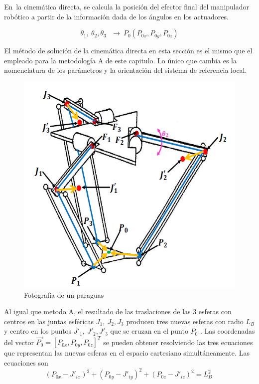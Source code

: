         En\ la cinemática directa, se calcula la posición del efector final del manipulador robótico a partir de la información dada de los ángulos en los actuadores.


        \begin{equation}
            \theta _{1},~ \theta _{2}, \theta _{3}~~~ \rightarrow ~  {P_{0}} \left( P_{0x},P_{0y},P_{0z} \right)
        \label{eq:cap4_MB_1}
        \end{equation}

        El método de solución de la cinemática directa en esta sección es el mismo que el empleado para la metodología A de este capitulo. Lo único que cambia es la nomenclatura de los parámetros y la orientación del sistema de referencia local.
        
            \begin{figure}[htb]
                 \centering
                 \includegraphics[width=0.7\linewidth]{Main/Chapter4/Images4/Metodo_B_Modelacion_Cinematica_Posicion_3.png}
                  \caption{Fotografía de un paraguas}
                  \label{f:Cap4_Metodo_B_Modelacion_Cinematica_Posicion_3}
            \end{figure}        
        
    Al igual que metodo A, el resultado de las traslaciones de las 3 esferas con centros en las juntas esféricas  \( J_{1},~J_{2},J_{3} \)  producen tres nuevas esferas con radio  \( L_{B} \)  y centro en los puntos  \( J'_{1},~J'_{2},J'_{3} \)   que se cruzan en el punto  \( P_{0} \) . Las coordenadas del vector  \( \overrightarrow{P_{0}}=  \left[ P_{0x},P_{0y},P_{0z} \right] ^{T} \)  se pueden obtener resolviendo las tres ecuaciones que representan las nuevas esferas en el espacio cartesiano simultáneamente. Las ecuaciones son        
        \begin{equation}
            \left( P_{0x}-J'_{ix} \right) ^{2}+ \left( P_{0y}-J'_{iy} \right) ^{2}+ \left( P_{0z}-J'_{iz} \right) ^{2}=L_{B}^{2}~
        \label{eq:cap4_MB_2}
        \end{equation}        
  
